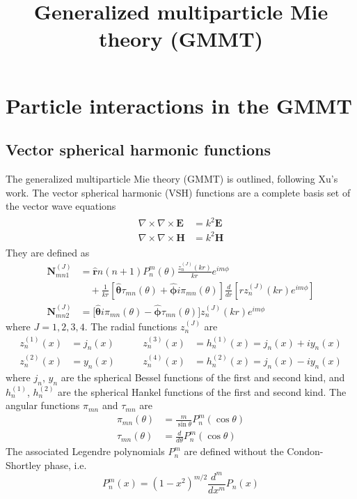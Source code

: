 \documentclass[11pt]{article}
\title{Generalized multiparticle Mie theory (GMMT)}
\date{}
\author{}
\begin{document}
\maketitle
\tableofcontents

\section{Particle interactions in the GMMT}
\subsection{Vector spherical harmonic functions}

The generalized multiparticle Mie theory (GMMT) is outlined, following Xu's work. \cite{xu1995electromagnetic}
The vector spherical harmonic (VSH) functions are a complete basis set of the vector wave equations
\begin{align}
    \begin{split}
        \nabla \times \nabla \times \boldsymbol{E} &= k^2 \boldsymbol{E} \\
        \nabla \times \nabla \times \boldsymbol{H} &= k^2 \boldsymbol{H}
    \end{split}
\end{align}
They are defined as
\begin{align}
    \boldsymbol{N}_{mn1}^{(J)} &= 
    \boldsymbol{\hat r} n(n+1) P_n^m(\theta) \frac{z_n^{(J)}(kr)}{kr}e^{im\phi} \nonumber \\
    &\quad + \frac{1}{kr} \left[ \boldsymbol{\hat \theta} \tau_{mn}(\theta) + \boldsymbol{\hat \phi} i\pi_{mn}(\theta) \right]
    \frac{d}{dr} \left[ rz_n^{(J)}(kr)e^{im\phi} \right] \\
    \boldsymbol{N}_{mn2}^{(J)} &= \big[
    \boldsymbol{\hat \theta} i\pi_{mn}(\theta) 
   -\boldsymbol{\hat \phi} \tau_{mn}(\theta) \big] z_n^{(J)}(kr) e^{im\phi} \nonumber
\end{align}
where $J= 1,2,3,4$. The radial functions $z_n^{(J)}$ are
\begin{equation}
\begin{align*}
    z_n^{(1)}(x) &= j_n(x)  \qquad&  z_n^{(3)}(x) &= h_n^{(1)}(x) = j_n(x) + iy_n(x)   \\
z_n^{(2)}(x) &= y_n(x)  \qquad&  z_n^{(4)}(x) &= h_n^{(2)}(x) = j_n(x) - iy_n(x)
\end{align*}
\end{equation}
where $j_n$, $y_n$ are the spherical Bessel functions of the first and second kind, and $h_n^{(1)}$, $h_n^{(2)}$ are the spherical Hankel functions of the first and second kind.
The angular functions $\pi_{mn}$ and $\tau_{mn}$ are
\begin{align}
\pi_{mn}(\theta) &= \frac{m}{\sin\theta} P_n^m(\cos\theta) \\
\tau_{mn}(\theta) &= \frac{d}{d\theta} P_n^m(\cos\theta) 
\end{align}
The associated Legendre polynomials $P_n^m$ are defined without the Condon-Shortley phase, i.e.\
\begin{equation}
P_n^m(x) = (1 - x^2)^{m/2} \frac{d^m}{dx^m} P_n(x)
\end{equation}
\end{document}
